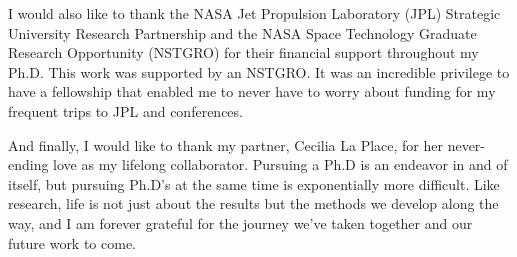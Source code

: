 I would also like to thank the NASA Jet Propulsion Laboratory (JPL) Strategic University Research Partnership and the NASA Space Technology Graduate Research Opportunity (NSTGRO) for their financial support throughout my Ph.D. 
This work was supported by an NSTGRO. 
It was an incredible privilege to have a fellowship that enabled me to never have to worry about funding for my frequent trips to JPL and conferences.

And finally, I would like to thank my partner, Cecilia La Place, for her never-ending love as my lifelong collaborator. 
Pursuing a Ph.D is an endeavor in and of itself, but pursuing Ph.D's at the same time is exponentially more difficult.
Like research, life is not just about the results but the methods we develop along the way, and I am forever grateful for the journey we've taken together and our future work to come.